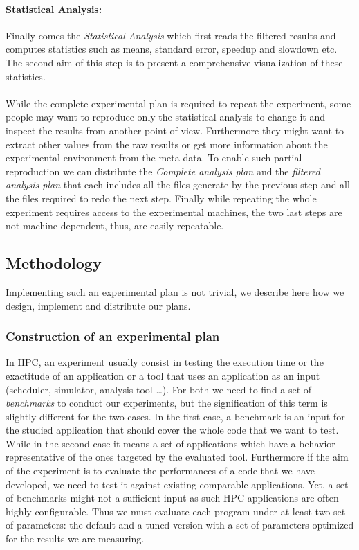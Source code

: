 \paragraph{Statistical Analysis:}
Finally comes the \emph{Statistical Analysis} which first reads the filtered results and computes statistics such as means, standard error, speedup and slowdown etc.
The second aim of this step is to present a comprehensive visualization of these statistics.

\paragraph{}
While the complete experimental plan is required to repeat the experiment, some people may want to reproduce only the statistical analysis to change it and inspect the results from another point of view.
Furthermore they might want to extract other values from the raw results or get more information about the experimental environment from the meta data.
To enable such partial reproduction we can distribute the \emph{Complete analysis plan} and the \emph{filtered analysis plan} that each includes all the files generate by the previous step and all the files required to redo the next step.
Finally while repeating the whole experiment requires access to the experimental machines, the two last steps are not machine dependent, thus, are easily repeatable.

\subsection{Methodology}

Implementing such an experimental plan is not trivial, we describe here how we design, implement and distribute our plans.

\subsubsection{Construction of an experimental plan}

In \gls{HPC}, an experiment usually consist in testing the execution time or the exactitude of an application or a tool that uses an application as an input (scheduler, simulator, analysis tool \ldots).
For both we need to find a set of \emph{benchmarks} to conduct our experiments, but the signification of this term is slightly different for the two cases.
In the first case, a benchmark is an input for the studied application that should cover the whole code that we want to test.
While in the second case it means a set of applications which have a behavior representative of the ones targeted by the evaluated tool.
Furthermore if the aim of the experiment is to evaluate the performances of a code that we have developed, we need to test it against existing comparable applications.
Yet, a set of benchmarks might not a sufficient input as such \gls{HPC} applications are often highly configurable.
Thus we must evaluate each program under at least two set of parameters: the default and a tuned version with a set of parameters optimized for the results we are measuring.

